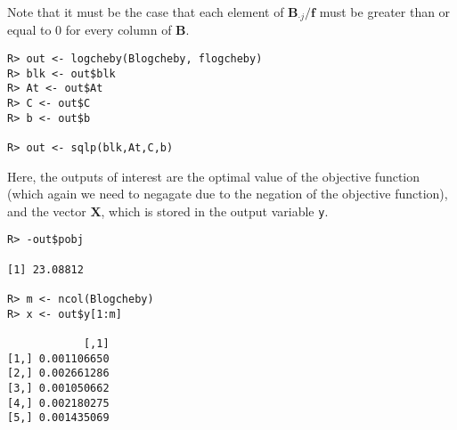 \documentclass{article}
\newcommand{\ve}[1]{\mathbf{#1}}           %
\newcommand{\m}[1]{\mathbf{#1}}               %
\begin{document}
Note that it must be the case that each element of $\m{B}_{\cdot j}/\ve{f}$ must be greater than or equal to $0$ for every column of $\m{B}$.

\begin{verbatim}
R> out <- logcheby(Blogcheby, flogcheby)
R> blk <- out$blk
R> At <- out$At
R> C <- out$C
R> b <- out$b

R> out <- sqlp(blk,At,C,b)
\end{verbatim}

Here, the outputs of interest are the optimal value of the objective function (which again we need to negagate due to the negation of the objective function), and the vector $\ve{X}$, which is stored in the output variable \verb!y!.

\begin{verbatim}
R> -out$pobj

[1] 23.08812

R> m <- ncol(Blogcheby)
R> x <- out$y[1:m]

            [,1]
[1,] 0.001106650
[2,] 0.002661286
[3,] 0.001050662
[4,] 0.002180275
[5,] 0.001435069
\end{verbatim}



\end{document}
